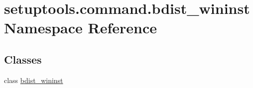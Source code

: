 \hypertarget{namespacesetuptools_1_1command_1_1bdist__wininst}{}\section{setuptools.\+command.\+bdist\+\_\+wininst Namespace Reference}
\label{namespacesetuptools_1_1command_1_1bdist__wininst}
\subsection*{Classes}
\begin{DoxyCompactItemize}
\item 
class \hyperlink{classsetuptools_1_1command_1_1bdist__wininst_1_1bdist__wininst}{bdist\+\_\+wininst}
\end{DoxyCompactItemize}
